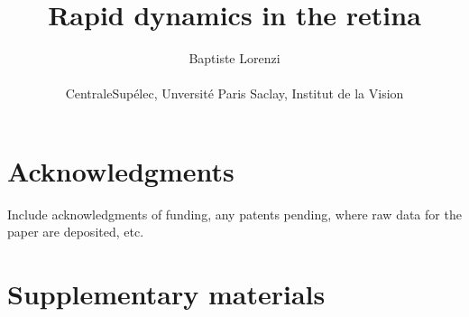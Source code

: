 \documentclass[12pt]{article}
\title{Rapid dynamics in the retina}
\author{Baptiste Lorenzi\\
    \\
    \normalsize{CentraleSupélec, Unversité Paris Saclay, Institut de la
        Vision}\\}
\date{}
\begin{document}

\baselineskip24pt


\maketitle














% 

\section*{Acknowledgments}
Include acknowledgments of funding, any patents pending, where raw data for the
paper are deposited, etc.

\section*{Supplementary materials}

\clearpage
\end{document}
